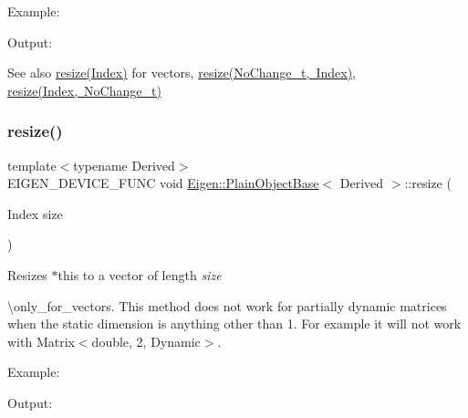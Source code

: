 Example\+: 
\begin{DoxyCodeInclude}{0}
\end{DoxyCodeInclude}
 Output\+: 
\begin{DoxyVerbInclude}
\end{DoxyVerbInclude}


\begin{DoxySeeAlso}{See also}
\mbox{\hyperlink{class_eigen_1_1_plain_object_base_abf8a9ec07cd52a2cdabb527596f7ddd1}{resize(\+Index)}} for vectors, \mbox{\hyperlink{class_eigen_1_1_plain_object_base_ab71a655f73d05a0e389e3ed13b6fe5f3}{resize(\+No\+Change\+\_\+t, Index)}}, \mbox{\hyperlink{class_eigen_1_1_plain_object_base_a7b44761b7350ae3756035bbf7d7c04f6}{resize(\+Index, No\+Change\+\_\+t)}} 
\end{DoxySeeAlso}
\mbox{\label{class_eigen_1_1_plain_object_base_abf8a9ec07cd52a2cdabb527596f7ddd1}} 
\subsubsection{\texorpdfstring{resize()}{resize()}\hspace{0.1cm}{\footnotesize\ttfamily [2/4]}}
{\footnotesize\ttfamily template$<$typename Derived$>$ \\
E\+I\+G\+E\+N\+\_\+\+D\+E\+V\+I\+C\+E\+\_\+\+F\+U\+NC void \mbox{\hyperlink{class_eigen_1_1_plain_object_base}{Eigen\+::\+Plain\+Object\+Base}}$<$ Derived $>$\+::resize (\begin{DoxyParamCaption}\item[{Index}]{size }\end{DoxyParamCaption})\hspace{0.3cm}{\ttfamily [inline]}}

Resizes {\ttfamily $\ast$this} to a vector of length {\itshape size} 

\textbackslash{}only\+\_\+for\+\_\+vectors. This method does not work for partially dynamic matrices when the static dimension is anything other than 1. For example it will not work with Matrix$<$double, 2, Dynamic$>$.

Example\+: 
\begin{DoxyCodeInclude}{0}
\end{DoxyCodeInclude}
 Output\+: 
\begin{DoxyVerbInclude}
\end{DoxyVerbInclude}


